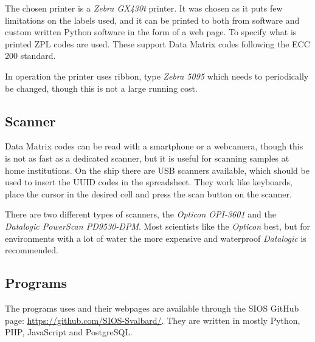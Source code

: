 \documentclass[a4paper,english, 11pt]{article}
\begin{document}
The chosen printer is a \emph{Zebra GX430t} printer. It was chosen as it puts few limitations on the labels used, and it can be printed to both from software and custom written Python software in the form of a web page. To specify what is printed ZPL codes are used. These support Data Matrix codes following the ECC 200 standard.


In operation the printer uses ribbon, type \emph{Zebra 5095} which needs to periodically be changed, though this is not a large running cost.

\subsection{Scanner} %
\label{sub:Scanner}

Data Matrix codes can be read with a smartphone or a webcamera, though this is not as fast as a dedicated scanner, but it is useful for scanning samples at home institutions. On the ship there are USB scanners available, which should be used to insert the UUID codes in the spreadsheet. They work like keyboards, place the cursor in the desired cell and press the scan button on the scanner.

There are two different types of scanners, the \emph{Opticon OPI-3601} and the \emph{Datalogic PowerScan PD9530-DPM}. Most scientists like the \emph{Opticon} best, but for environments with a lot of water the more expensive and waterproof \emph{Datalogic} is recommended.

\subsection{Programs} %
\label{sub:Programs}
The programs uses and their webpages are available through the SIOS GitHub page: \url{https://github.com/SIOS-Svalbard/}. They are written in mostly Python, PHP, JavaScript and PostgreSQL.

\end{document}
